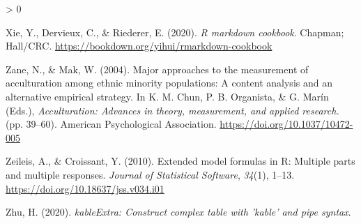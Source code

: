 \documentclass[
  american,
  man]{apa7}
\newlength{\cslhangindent}
\newenvironment{CSLReferences}[2] %
 {%
  \setlength{\parindent}{0pt}
  \ifodd #1 \everypar{\setlength{\hangindent}{\cslhangindent}}\ignorespaces\fi
  \ifnum #2 > 0
  \setlength{\parskip}{#2\baselineskip}
  \fi
 }%
 {}
\begin{document}
\begin{CSLReferences}{1}{0}
\leavevmode\hypertarget{ref-R-rmarkdown_b}{}%
Xie, Y., Dervieux, C., \& Riederer, E. (2020). \emph{R markdown cookbook}. Chapman; Hall/CRC. \url{https://bookdown.org/yihui/rmarkdown-cookbook}

\leavevmode\hypertarget{ref-Zane2004}{}%
Zane, N., \& Mak, W. (2004). {Major approaches to the measurement of acculturation among ethnic minority populations: A content analysis and an alternative empirical strategy.} In K. M. Chun, P. B. Organista, \& G. Marín (Eds.), \emph{Acculturation: Advances in theory, measurement, and applied research.} (pp. 39--60). American Psychological Association. \url{https://doi.org/10.1037/10472-005}

\leavevmode\hypertarget{ref-R-Formula}{}%
Zeileis, A., \& Croissant, Y. (2010). Extended model formulas in {R}: Multiple parts and multiple responses. \emph{Journal of Statistical Software}, \emph{34}(1), 1--13. \url{https://doi.org/10.18637/jss.v034.i01}

\leavevmode\hypertarget{ref-R-kableExtra}{}%
Zhu, H. (2020). \emph{kableExtra: Construct complex table with 'kable' and pipe syntax}.

\end{CSLReferences}

\endgroup
\end{document}
